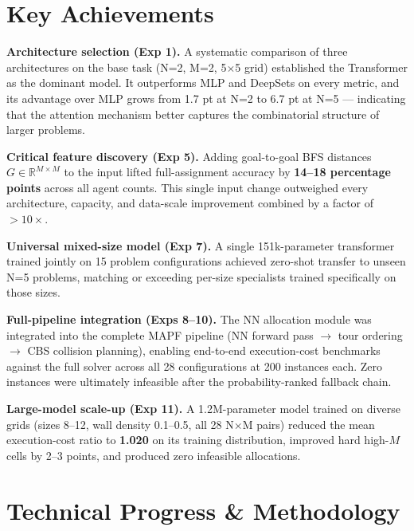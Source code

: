 \documentclass[11pt,a4paper]{article}
\begin{document}
\section{Key Achievements}

\textbf{Architecture selection (Exp 1).} A systematic comparison of three architectures on the
base task (N=2, M=2, 5$\times$5 grid) established the Transformer as the dominant model. It
outperforms MLP and DeepSets on every metric, and its advantage over MLP grows from 1.7 pt at
N=2 to 6.7 pt at N=5 --- indicating that the attention mechanism better captures the combinatorial
structure of larger problems.

\textbf{Critical feature discovery (Exp 5).} Adding goal-to-goal BFS distances
$G\in\mathbb{R}^{M\times M}$ to the input lifted full-assignment accuracy by \textbf{14--18
percentage points} across all agent counts. This single input change outweighed every
architecture, capacity, and data-scale improvement combined by a factor of $>10\times$.

\textbf{Universal mixed-size model (Exp 7).} A single 151k-parameter transformer trained jointly
on 15 problem configurations achieved zero-shot transfer to unseen N=5 problems, matching or
exceeding per-size specialists trained specifically on those sizes.

\textbf{Full-pipeline integration (Exps 8--10).} The NN allocation module was integrated into
the complete MAPF pipeline (NN forward pass $\to$ tour ordering $\to$ CBS collision planning),
enabling end-to-end execution-cost benchmarks against the full solver across all 28 configurations
at 200 instances each. Zero instances were ultimately infeasible after the probability-ranked
fallback chain.

\textbf{Large-model scale-up (Exp 11).} A 1.2M-parameter model trained on diverse grids (sizes
8--12, wall density 0.1--0.5, all 28 N$\times$M pairs) reduced the mean execution-cost ratio
to \textbf{1.020} on its training distribution, improved hard high-$M$ cells by 2--3 points,
and produced zero infeasible allocations.

\section{Technical Progress \& Methodology}
\end{document}
